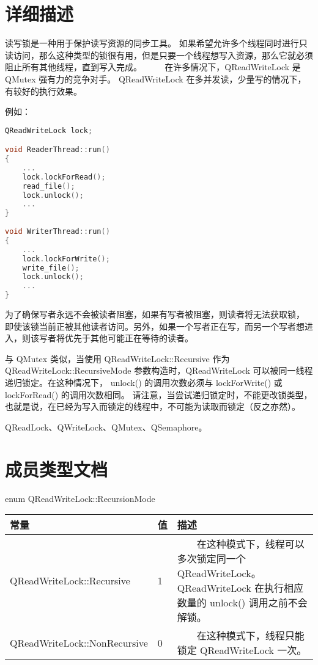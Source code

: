 \section{详细描述}

读写锁是一种用于保护读写资源的同步工具。
如果希望允许多个线程同时进行只读访问，那么这种类型的锁很有用，但是只要一个线程想写入资源，那么它就必须阻止所有其他线程，直到写入完成。
  
在许多情况下，QReadWriteLock 是 QMutex 强有力的竞争对手。
QReadWriteLock 在多并发读，少量写的情况下，有较好的执行效果。

例如：

\begin{lstlisting}[language=C++]
QReadWriteLock lock;

void ReaderThread::run()
{
    ...
    lock.lockForRead();
    read_file();
    lock.unlock();
    ...
}
    
void WriterThread::run()
{
    ...
    lock.lockForWrite();
    write_file();
    lock.unlock();
    ...
}
\end{lstlisting}

为了确保写者永远不会被读者阻塞，如果有写者被阻塞，则读者将无法获取锁，
即使该锁当前正被其他读者访问。另外，如果一个写者正在写，而另一个写者想进入，则该写者将优先于其他可能正在等待的读者。

与 QMutex 类似，当使用 QReadWriteLock::Recursive 作为 QReadWriteLock::RecursiveMode 参数构造时，QReadWriteLock 可以被同一线程递归锁定。在这种情况下，
unlock() 的调用次数必须与 lockForWrite() 或 lockForRead() 的调用次数相同。
请注意，当尝试递归锁定时，不能更改锁类型，也就是说，在已经为写入而锁定的线程中，不可能为读取而锁定（反之亦然）。

\begin{notice}[另请参阅]
QReadLock、QWriteLock、QMutex、QSemaphore。
\end{notice}


\section{成员类型文档}

enum QReadWriteLock::RecursionMode

\begin{tabular}{|l|l|l|}
\hline
常量 &	值  &	描述 \\ 
\hline
QReadWriteLock::Recursive  &	1  &	  在这种模式下，线程可以多次锁定同一个 QReadWriteLock。QReadWriteLock 在执行相应数量的 unlock() 调用之前不会解锁。 \\ 
\hline
QReadWriteLock::NonRecursive &	0 	&  在这种模式下，线程只能锁定 QReadWriteLock 一次。 \\ 
\hline
\end{tabular}


